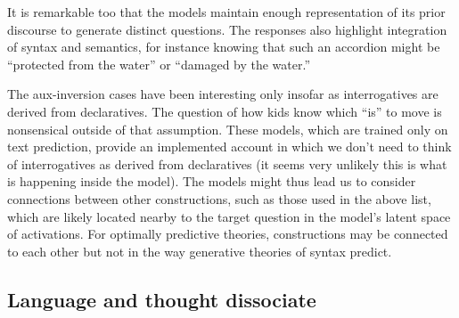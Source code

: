 \documentclass[output=paper,colorlinks,citecolor=brown
]{langscibook}
\begin{document}
\noindent It is remarkable too that the models maintain enough representation of its prior discourse to generate distinct questions. The responses also highlight integration of syntax and semantics, for instance knowing that such an accordion might be ``protected from the water'' or ``damaged by the water.'' 

The aux-inversion cases have been interesting only insofar as interrogatives are derived from declaratives. The question of how kids know which ``is'' to move is nonsensical outside of that assumption. These models, which are trained only on text prediction, provide an implemented account in which we don't need to think of interrogatives as derived from declaratives (it seems very unlikely this is what is happening inside the model). The models might thus lead us to consider connections between other constructions, such as those used in the above list, which are likely located nearby to the target question in the model's latent space of activations. For optimally predictive theories, constructions may be connected to each other but not in the way generative theories of syntax predict.
   





\subsection{Language and thought dissociate}
\end{document}
